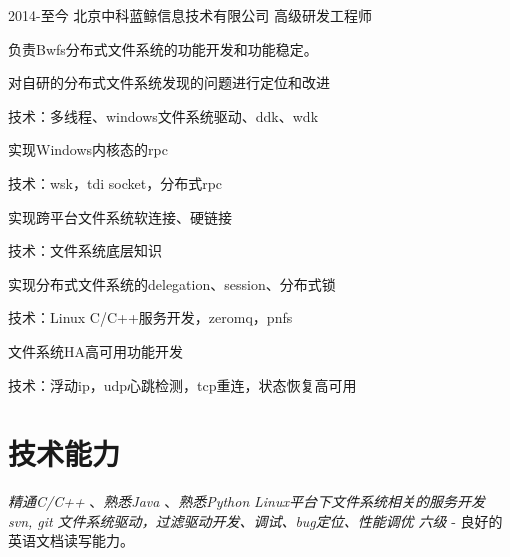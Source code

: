 \documentclass[10pt]{article} %
\begin{document}
\job
{2014-至今}
{北京中科蓝鲸信息技术有限公司}
{高级研发工程师}
{负责Bwfs分布式文件系统的功能开发和功能稳定。
\begin{itemize-noindent}
\item{对自研的分布式文件系统发现的问题进行定位和改进}
\item{技术：多线程、windows文件系统驱动、ddk、wdk}
\item{实现Windows内核态的rpc}
\item{技术：wsk，tdi socket，分布式rpc}
\item{实现跨平台文件系统软连接、硬链接}
\item{技术：文件系统底层知识}
\item{实现分布式文件系统的delegation、session、分布式锁}
\item{技术：Linux C/C++服务开发，zeromq，pnfs}
\item{文件系统HA高可用功能开发}
\item{技术：浮动ip，udp心跳检测，tcp重连，状态恢复高可用}
\end{itemize-noindent}
}
\section{技术能力}
{
\textit{精通C/C++} 、\textit{熟悉Java} 、\textit{熟悉Python}
}
{
\textit{Linux平台下文件系统相关的服务开发}\\
\textit{svn, git}
}
{
\textit{文件系统驱动，过滤驱动开发、调试、bug定位、性能调优}
}
{
\textit{六级} - 良好的英语文档读写能力。
}
\end{document}

